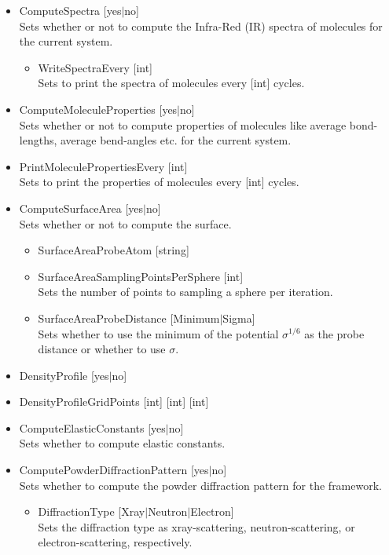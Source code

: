 \begin{itemize}
\item{ComputeSpectra [yes$|$no]}\\
Sets whether or not to compute the Infra-Red (IR) spectra of molecules for the current system.
\begin{itemize}
\item{WriteSpectraEvery [int]}\\
Sets to print the spectra of molecules every [int] cycles.
\end{itemize}
\item{ComputeMoleculeProperties [yes$|$no]}\\
Sets whether or not to compute properties of molecules like average bond-lengths, average bend-angles etc. for the current system.
\item{PrintMoleculePropertiesEvery [int]}\\
Sets to print the properties of molecules every [int] cycles.
\item{ComputeSurfaceArea [yes$|$no]}\\
Sets whether or not to compute the surface.
\begin{itemize}
\item{SurfaceAreaProbeAtom [string]}\\
\item{SurfaceAreaSamplingPointsPerSphere [int]}\\
Sets the number of points to sampling a sphere per iteration.
\item{SurfaceAreaProbeDistance [Minimum$|$Sigma]}\\
Sets whether to use the minimum of the potential $\sigma^{1/6}$ as the probe distance or whether to use $\sigma$.
\end{itemize}
\item{DensityProfile [yes$|$no]}\\
\item{DensityProfileGridPoints [int] [int] [int]}\\
\item{ComputeElasticConstants [yes$|$no]}\\
Sets whether to compute elastic constants.
\item{ComputePowderDiffractionPattern [yes$|$no]}\\
Sets whether to compute the powder diffraction pattern for the framework.
\begin{itemize}
\item{DiffractionType [Xray$|$Neutron$|$Electron]}\\
Sets the diffraction type as xray-scattering, neutron-scattering, or electron-scattering, respectively.

\end{itemize}
\end{itemize}
